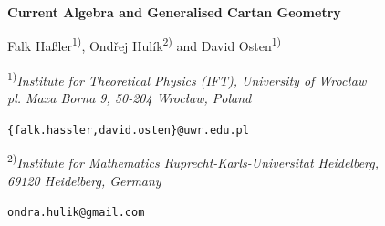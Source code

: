 \documentclass[11pt,a4paper]{article}
\numberwithin{equation}{section}
\begin{document}

\renewcommand*{\thefootnote}{\fnsymbol{footnote}}
\begin{center}

{\LARGE \bf Current Algebra and Generalised Cartan Geometry}


\vspace{0.5truecm}

{Falk Ha\ss ler\textsuperscript{1)}, Ondřej Hulík\textsuperscript{2)} and David Osten\textsuperscript{1)}}

\vspace{0.5truecm}

{\textsuperscript{1)}\em Institute for Theoretical Physics (IFT), University of Wroc\l aw \\
pl. Maxa Borna 9, 50-204 Wroc\l aw, Poland
}

\vspace{0.2truecm}

{{\tt \{falk.hassler,david.osten\}@uwr.edu.pl}}

\vspace{0.5truecm}

{\textsuperscript{2)}\em Institute for Mathematics 
 Ruprecht-Karls-Universitat Heidelberg,
 \\
 69120 Heidelberg, Germany 
}

\vspace{0.2truecm}

{\tt ondra.hulik@gmail.com}

\vspace{0.5truecm}
\end{center}
\begin{abstract}
This article shows that the approach to generalised curvature and torsion pioneered by Poláček and Siegel \cite{Polacek:2013nla} is a generalisation of Cartan Geometry -- rendering latter natural from the point of view of O$(d,d)$-generalised geometry. We present this approach in the generalised metric formalism and show that almost all parts of the additional higher generalised tensors appearing in this approach correspond to covariant derivatives of the generalised Riemann tensor. As an application, we use this framework to phrase $\sigma$-model dynamics in an explicitly covariant way -- both under generalised diffeomorphisms and local gauge transformations.
\end{abstract}
\end{document}
